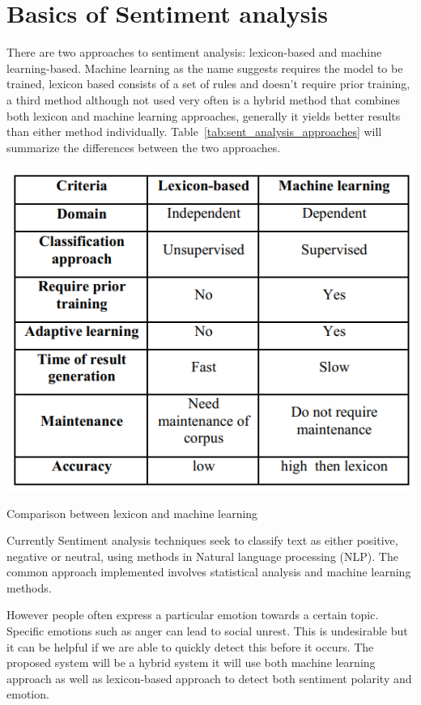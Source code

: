 \chapter{Basics of Sentiment analysis}\label{ch:THEORY}

There are two approaches to sentiment analysis: lexicon-based and machine learning-based.
%
Machine learning as the name suggests requires the model to be trained, lexicon based consists of a set of rules and doesn’t require prior training, a third method although not used very often is a hybrid method that combines both lexicon and machine learning approaches, generally it yields better results than either method individually.\cite{ref2}
%
Table~\ref{tab:sent_analysis_approaches} will summarize the differences between the two approaches.

\begin{table}[h]
  \centering
  \includegraphics[width=0.5\linewidth]{images/lex_vs_ml.png}
  \caption{Comparison between lexicon and machine learning}
  \label{tab:sent_analysis_approaches}
\end{table}

Currently Sentiment analysis techniques seek to classify text as either positive, negative or neutral, using methods in Natural language processing (NLP). The common approach implemented involves statistical analysis and machine learning methods.\cite{ref2}

%
However people often express a particular emotion towards a certain topic. Specific emotions such as anger can lead to social unrest. This is undesirable but it can be helpful if we are able to quickly detect this before it occurs.
%
The proposed system will be a hybrid system it will use both machine learning approach as well as lexicon-based approach to detect both sentiment polarity and emotion.


\clearpage



